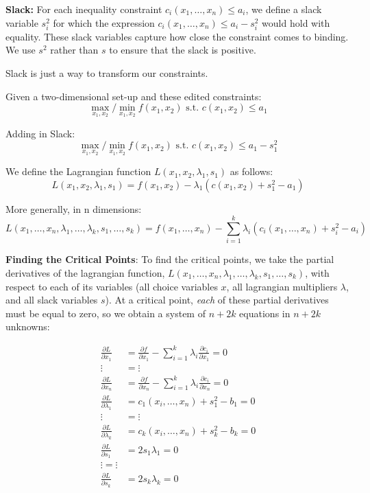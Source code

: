 \documentclass[
]{book}
\theoremstyle{definition}
\theoremstyle{definition}
\theoremstyle{definition}
\theoremstyle{remark}
\begin{document}
\textbf{Slack:} For each inequality constraint \(c_i(x_1, \dots, x_n) \leq a_i\), we define a slack variable \(s_i^2\) for which the expression \(c_i(x_1, \dots, x_n) \leq a_i - s_i^2\) would hold with equality. These slack variables capture how close the constraint comes to binding. We use \(s^2\) rather than \(s\) to ensure that the slack is positive.

Slack is just a way to transform our constraints.

Given a two-dimensional set-up and these edited constraints:
\[\max_{x_1,x_2}/\min_{x_1,x_2} f(x_1,x_2) \text{ s.t. } c(x_1,x_2) \le a_1\]

Adding in Slack:
\[\max_{x_1,x_2}/\min_{x_1,x_2} f(x_1,x_2) \text{ s.t. } c(x_1,x_2) \le a_1 - s_1^2\]

We define the Lagrangian function \(L(x_1,x_2,\lambda_1,s_1)\) as follows:
\[L(x_1,x_2,\lambda_1,s_1) = f(x_1,x_2) - \lambda_1 ( c(x_1,x_2) + s_1^2 - a_1)\]

More generally, in n dimensions:
\[ L(x_1, \dots, x_n, \lambda_1, \dots, \lambda_k, s_1, \dots, s_k) = f(x_1, \dots, x_n) - \sum_{i = 1}^k \lambda_i(c_i(x_1,\dots, x_n) + s_i^2 - a_i)\]

\textbf{Finding the Critical Points}: To find the critical points, we take the partial derivatives of the lagrangian function, \(L(x_1,\dots,x_n,\lambda_1,\dots,\lambda_k,s_1,\dots,s_k)\), with respect to each of its variables (all choice variables \(x\), all lagrangian multipliers \(\lambda\), and all slack variables \(s\)). At a critical point, \emph{each} of these partial derivatives must be equal to zero, so we obtain a system of \(n + 2k\) equations in \(n + 2k\) unknowns:

\begin{align*}
\frac{\partial L}{\partial x_1} &= \frac{\partial f}{\partial x_1} - \sum_{i = 1}^k\lambda_i\frac{\partial c_i}{\partial x_1} = 0\\
 \vdots & =  \vdots  \\
\frac{\partial L}{\partial x_n}  &= \frac{\partial f}{\partial x_n} - \sum_{i = 1}^k\lambda_i\frac{\partial c_i}{\partial x_n} = 0\\
\frac{\partial L}{\partial \lambda_1} &= c_1(x_i, \dots, x_n) + s_1^2 - b_1 = 0\\
 \vdots & = \vdots \\
\frac{\partial L}{\partial \lambda_k} &= c_k(x_i, \dots, x_n) + s_k^2 - b_k = 0\\
\frac{\partial L}{\partial s_1} &= 2s_1\lambda_1 = 0\\
 \vdots =\vdots \\
\frac{\partial L}{\partial s_k} &= 2s_k\lambda_k = 0
\end{align*}
\end{document}
